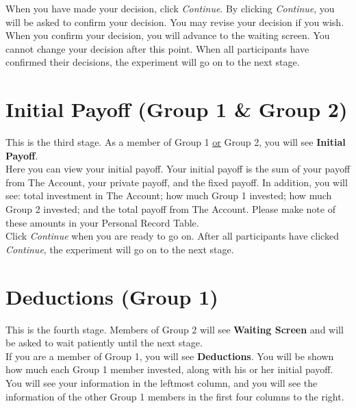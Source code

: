 \documentclass[12pt]{article}
\begin{document}
When you have made your decision, click {\em Continue}.  By clicking {\em Continue}, you will be asked to confirm your decision.  You may revise your decision if you wish.  When you confirm your decision, you will advance to the waiting screen.  You cannot change your decision after this point. When all participants have confirmed their decisions, the experiment will go on to the next stage. \\ 



\section{Initial Payoff (Group 1 \& Group 2)}

This is the third stage. As a member of Group 1  \underline{or} Group 2, you will see {\bf Initial Payoff}.\\

Here you can view your initial payoff.  Your initial payoff is the sum of your payoff from The Account, your private payoff, and the fixed payoff. In addition, you will see: total investment in The Account; how much Group 1 invested; how much Group 2 invested; and the total payoff from The Account. Please make note of these amounts in your Personal Record Table.\\

Click {\em Continue} when you are ready to go on.  After all participants have clicked {\em Continue}, the experiment will go on to the next stage.\\  



\section{Deductions (Group 1)}

This is the fourth stage. Members of Group 2 will see {\bf Waiting Screen} and will be asked to wait patiently until the next stage.\\   

If you are a member of Group 1, you will see {\bf Deductions}. You will be shown how much each Group 1 member invested, along with his or her initial payoff. You will see your information in the leftmost column, and you will see the information of the other Group 1 members in the first four columns to the right.\\
\end{document}
